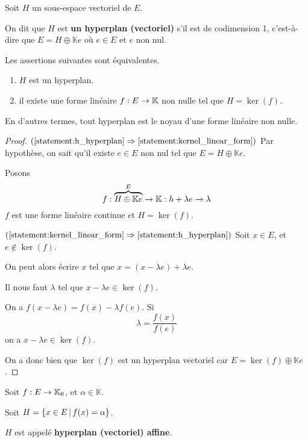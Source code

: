 \begin{definition} [Hyperplan]
	Soit $H$ un sous-espace vectoriel de $E$.

	On dit que $H$ est \textbf{un hyperplan (vectoriel)} s'il est de codimension
	1, c'est-à-dire que $E = H \oplus \mathbb{K}e$ où $e \in E$ et $e$ non nul.
\end{definition}

\begin{proposition}
	Les assertions suivantes sont équivalentes.
	\begin{enumerate}
		\item \label{statement:h_hyperplan} $H$ est un hyperplan.
		\item \label{statement:kernel_linear_form} il existe une forme linéaire $\GSfunction{f}{E}{\mathbb{K}}$ non nulle tel que $H = \ker(f)$.
	\end{enumerate}
	En d'autres termes, tout hyperplan est le noyau d'une forme linéaire non
	nulle.
\end{proposition}

\ifdefined\outputproof
\begin{proof}
	$(\ref{statement:h_hyperplan} \implies \ref{statement:kernel_linear_form})$
	Par hypothèse, on sait qu'il existe $e \in E$ non nul tel que $E = H \oplus \mathbb{K}e$.

	Posons
	\begin{equation}
		\GSfunction{f}{\overbrace{H \oplus \mathbb{K}e}^{E}}{\mathbb{K}} : h + \lambda e \rightarrow \lambda
	\end{equation}
	$f$ est une forme linéaire continue et $H = \ker(f)$.

	$(\ref{statement:kernel_linear_form} \implies \ref{statement:h_hyperplan})$
	Soit $x \in E$, et $e \notin \ker(f)$.

	On peut alors écrire $x$ tel que $x = (x - \lambda e) + \lambda e$.

	Il nous faut $\lambda$ tel que $x - \lambda e \in
	\ker(f)$.

	On a $f(x - \lambda e) = f(x) - \lambda f(e)$.
	Si
	\begin{equation}
		\lambda = \frac{f(x)}{f(e)}
	\end{equation}
	on a $x - \lambda e \in \ker(f)$.
	
	On a donc bien que $\ker(f)$ est un hyperplan vectoriel car $E = \ker(f)
	\oplus \mathbb{K}e$.
\end{proof}
\fi

\begin{definition} 
	Soit $\GSfunction{f}{E}{\mathbb{K}_{0}}$, et $\alpha \in \mathbb{K}$.

	Soit $H = \GSsetDef{x \in E}{f(x) = \alpha}$.

	$H$ est appelé \textbf{hyperplan (vectoriel) affine}.
\end{definition}


